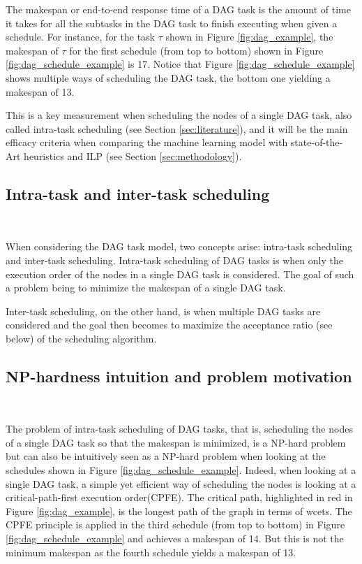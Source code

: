 The makespan or end-to-end response time of a 
DAG task is the amount of time it takes for all the subtasks
in the DAG task to finish executing when given a schedule.
For instance, for the task $\tau$ shown in Figure \ref{fig:dag_example},
the makespan of $\tau$ for the first schedule (from top to bottom) shown in Figure \ref{fig:dag_schedule_example}
is 17.
Notice that Figure \ref{fig:dag_schedule_example} shows multiple
ways of scheduling the DAG task, the bottom one yielding a makespan of 13.

This is a key measurement when scheduling the nodes of a single DAG task,
also called intra-task scheduling (see Section \ref{sec:literature}),
and it will be the main efficacy criteria when comparing 
the machine learning model with state-of-the-Art heuristics and ILP
(see Section \ref{sec:methodology}).

\subsection{Intra-task and inter-task scheduling}
~

When considering the DAG task model,
two concepts arise: intra-task scheduling and inter-task scheduling.
Intra-task scheduling of DAG tasks is when only the execution
order of the nodes in a single DAG task is considered.
The goal of such a problem being to minimize the makespan
of a single DAG task.

Inter-task scheduling, on the other hand, is when multiple DAG tasks
are considered and the goal then becomes to maximize the acceptance ratio (see below)
of the scheduling algorithm.

\subsection{NP-hardness intuition and problem motivation}
~

The problem of intra-task scheduling of DAG tasks,
that is, scheduling the nodes of a single DAG task so that 
the makespan is minimized,
is a NP-hard problem\cite{ULLMAN1975NPhard}\cite{du1989schedNPhard}
but can also be intuitively seen as a NP-hard problem when looking at 
the schedules shown in Figure \ref{fig:dag_schedule_example}.
Indeed, 
when looking at a single DAG task,
a simple yet efficient way of scheduling the nodes 
is looking at a critical-path-first execution order(CPFE).
The critical path, highlighted in red in Figure \ref{fig:dag_example},
is the longest path of the graph in terms of wcets.
The CPFE principle is applied in the third schedule (from top to bottom)
in Figure \ref{fig:dag_schedule_example} and achieves a makespan of 14.
But this is not the minimum makespan as the fourth schedule yields a makespan
of 13.


